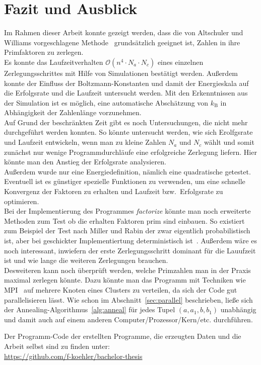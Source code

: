 \chapter{Fazit und Ausblick}\label{ch:conclusion}
Im Rahmen dieser Arbeit konnte gezeigt werden, dass die von Altschuler und Williams vorgeschlagene Methode~\parencite{altschuler} grundsätzlich geeignet ist, Zahlen in ihre Primfaktoren zu zerlegen. \\
Es konnte das Laufzeitverhalten $\mathcal{O}\left(n^4\cdot N_a \cdot N_c\right)$ eines einzelnen Zerlegungsschrittes mit Hilfe von Simulationen bestätigt werden. Außerdem konnte der Einfluss der Boltzmann-Konstanten und damit der Energieskala auf die Erfolgsrate und die Laufzeit untersucht werden. Mit den Erkenntnissen aus der Simulation ist es möglich, eine automatische Abschätzung von $k_\mathrm{B}$ in Abhängigkeit der Zahlenlänge vorzunehmen. \\
Auf Grund der beschränkten Zeit gibt es noch Untersuchungen, die nicht mehr durchgeführt werden konnten. So könnte untersucht werden, wie sich Erolfgsrate und Laufzeit entwickeln, wenn man zu kleine Zahlen $N_a$ und $N_c$ wählt und somit zunächst nur wenige Programmdurchläufe eine erfolgreiche Zerlegung liefern. Hier könnte man den Anstieg der Erfolgsrate analysieren.\\
Außerdem wurde nur eine Energiedefinition, nämlich eine quadratische getestet. Eventuell ist es günstiger spezielle Funktionen zu verwenden, um eine schnelle Konvergenz der Faktoren zu erhalten und Laufzeit bzw.\ Erfolgsrate zu optimieren. \\
Bei der Implementierung des Programmes \textit{factorize} könnte man noch erweiterte Methoden zum Test ob die erhalten Faktoren prim sind einbauen. So existiert zum Beispiel der Test nach Miller und Rabin der zwar eigentlich probabilistisch ist, aber bei geschickter Implementiertung deterministisch ist~\parencite{miller}. Außerdem wäre es noch interessant, inwiefern der erste Zerlegungsschritt dominant für die Lauufzeit ist und wie lange die weiteren Zerlegungen brauchen. \\
Desweiteren kann noch überprüft werden, welche Primzahlen man in der Praxis maximal zerlegen könnte. Dazu könnte man das Programm mit Techniken wie MPI~\parencite{mpi} auf mehrere Knoten eines Clusters zu verteilen, da sich der Code gut parallelisieren lässt. Wie schon im Abschnitt~\ref{sec:parallel} beschrieben, ließe sich der Annealing-Algorithmus~\ref{alg:anneal} für jedes Tupel $\left(a,a_1,b,b_1\right)$ unabhängig und damit auch auf einem anderen Computer/Prozessor/Kern/etc. durchführen.

\vfill
Der Programm-Code der erstellten Programme, die erzeugten Daten und die Arbeit selbst sind zu finden unter:\\
\url{https://github.com/f-koehler/bachelor-thesis}

